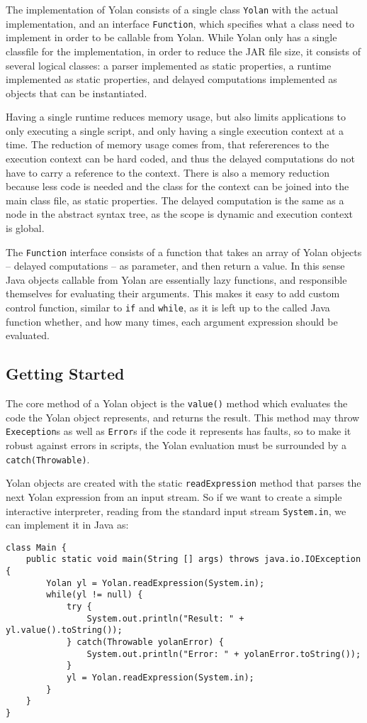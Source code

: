 \documentclass[11pt]{report}
\begin{document}
The implementation of Yolan consists of a single class \verb|Yolan| with the actual implementation, and an interface \verb|Function|, which specifies what a class need to implement in order to be callable from Yolan.
While Yolan only has a single classfile for the implementation, in order to reduce the JAR file size, it consists of several logical classes: a parser implemented as static properties, a runtime implemented as static properties, and delayed computations implemented as objects that can be instantiated.

Having a single runtime reduces memory usage, but also limits applications to only executing a single script, and only having a single execution context at a time. The reduction of memory usage comes from, that refererences to the execution context can be hard coded, and thus the delayed computations do not have to carry a reference to the context. There is also a memory reduction because less code is needed and the class for the context can be joined into the main class file, as static properties.
The delayed computation is the same as a node in the abstract syntax tree, as the scope is dynamic and execution context is global. 


The \verb|Function| interface consists of a function that takes an array of Yolan objects -- delayed computations -- as parameter, and then return a value. In this sense Java objects callable from Yolan are essentially lazy functions, and responsible themselves for evaluating their arguments. This makes it easy to add custom control function, similar to \verb|if| and \verb|while|, as it is left up to the called Java function whether, and how many times, each argument expression should be evaluated.

\subsection{Getting Started}
The core method of a Yolan object is the \verb|value()| method which evaluates the code the Yolan object represents, and returns the result. This method may throw \verb|Exeception|s as well as \verb|Error|s if the code it represents has faults, so to make it robust against errors in scripts, the Yolan evaluation must be surrounded by a \verb|catch(Throwable)|.

Yolan objects are created with the static \verb|readExpression| method that parses the next Yolan expression from an input stream. So if we want to create a simple interactive interpreter, reading from the standard input stream \verb|System.in|, we can implement it in Java as: \begin{lstlisting}
class Main {
    public static void main(String [] args) throws java.io.IOException {
        Yolan yl = Yolan.readExpression(System.in);
        while(yl != null) {
            try {
                System.out.println("Result: " + yl.value().toString());
            } catch(Throwable yolanError) {
                System.out.println("Error: " + yolanError.toString());
            }
            yl = Yolan.readExpression(System.in);
        }
    }
}\end{lstlisting} 
\end{document}

